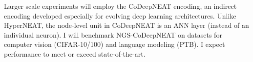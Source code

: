 Larger scale experiments will employ the CoDeepNEAT encoding,\autocite{miikkulainen2017evolving} an indirect encoding developed especially for evolving deep learning architectures.
Unlike HyperNEAT, the node-level unit in CoDeepNEAT is an ANN layer (instead of an individual neuron).
I will benchmark NGS-CoDeepNEAT on datasets for computer vision (CIFAR-10/100) and language modeling (PTB).
I expect performance to meet or exceed state-of-the-art.
